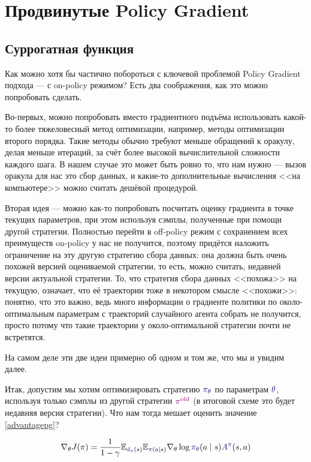 \section{Продвинутые Policy Gradient}\label{TRPOPPOsection}

\subsection{Суррогатная функция}

Как можно хотя бы частично побороться с ключевой проблемой Policy Gradient подхода --- с on-policy режимом? Есть два соображения, как это можно попробовать сделать.

Во-первых, можно попробовать вместо градиентного подъёма использовать какой-то более тяжеловесный метод оптимизации, например, методы оптимизации второго порядка. Такие методы обычно требуют меньше обращений к оракулу, делая меньше итераций, за счёт более высокой вычислительной сложности каждого шага. В нашем случае это может быть ровно то, что нам нужно --- вызов оракула для нас это сбор данных, и какие-то дополнительные вычисления <<на компьютере>> можно считать дешёвой процедурой. 

Вторая идея --- можно как-то попробовать посчитать оценку градиента в точке текущих параметров, при этом используя сэмплы, полученные при помощи другой стратегии. Полностью перейти в off-policy режим с сохранением всех преимуществ on-policy у нас не получится, поэтому придётся наложить ограничение на эту другую стратегию сбора данных: она должна быть очень похожей версией оцениваемой стратегии, то есть, можно считать, недавней версии актуальной стратегии. То, что стратегия сбора данных <<похожа>> на текущую, означает, что её траектории тоже в некотором смысле <<похожи>>: понятно, что это важно, ведь много информации о градиенте политики по около-оптимальным параметрам с траекторий случайного агента собрать не получится, просто потому что такие траектории у около-оптимальной стратегии почти не встретятся.

На самом деле эти две идеи примерно об одном и том же, что мы и увидим далее.

Итак, допустим мы хотим оптимизировать стратегию $\textcolor{ChadBlue}{\pi_\theta}$ по параметрам $\textcolor{ChadBlue}{\theta}$, используя только сэмплы из другой стратегии $\textcolor{ChadPurple}{\pi^{\old}}$ (в итоговой схеме это будет недавняя версия стратегии). Что нам тогда мешает оценить значение \eqref{advantagepg}?

$$
\nabla_{\theta} J(\pi) = \frac{1}{1 - \gamma}\E_{\textcolor{ChadBlue}{d_\pi}(s)} \E_{\textcolor{ChadBlue}{\pi}(a \mid s)} \nabla_{\theta} \log \textcolor{ChadBlue}{\pi_\theta} (a \mid s) \textcolor{ChadBlue}{A^{\pi}}(s, a)
$$

